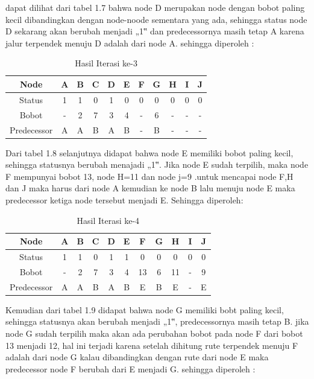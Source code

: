 \begin{enumerate}
dapat dilihat dari tabel 1.7 bahwa node D merupakan node dengan bobot paling kecil dibandingkan dengan node-noode sementara yang ada, sehingga status node D sekarang akan berubah menjadi „1‟ dan predecessornya masih tetap A karena jalur terpendek menuju D adalah dari node A. sehingga diperoleh :

\begin{table}[htbp]
\begin{center}
\begin{tabular}{|c|c|c|c|c|c|c|c|c|c|c|}
\hline
Node & A & B & C & D & E & F & G & H & I & J \\
\hline
Status & 1 & 1 & 0 & 1 & 0 & 0 & 0 & 0 & 0 & 0\\
\hline
Bobot & - & 2 & 7 & 3 & 4 & - & 6 & - & - & - \\
\hline
Predecessor & A & A & B & A & B & - & B & - & -  & - \\
\hline
\end{tabular}
\caption{Hasil Iterasi ke-3}
\end{center}
\end{table}

Dari tabel 1.8 selanjutnya didapat bahwa node E memiliki bobot paling kecil, sehingga statusnya berubah menajadi „1‟. Jika node E sudah terpilih, maka node F mempunyai bobot 13, node H=11 dan node j=9 .untuk mencapai node F,H dan J maka harus dari node A kemudian ke node B lalu menuju node E maka predecessor ketiga node tersebut menjadi E. Sehingga diperoleh:

\begin{table}[htbp]
\begin{center}
\begin{tabular}{|c|c|c|c|c|c|c|c|c|c|c|}
\hline
Node & A & B & C & D & E & F & G & H & I & J \\
\hline
Status & 1 & 1 & 0 & 1 & 1 & 0 & 0 & 0 & 0 & 0\\
\hline
Bobot & - & 2 & 7 & 3 & 4 & 13 & 6 & 11 & - & 9 \\
\hline
Predecessor & A & A & B & A & B & E & B & E & -  & E \\
\hline
\end{tabular}
\caption{Hasil Iterasi ke-4}
\end{center}
\end{table}

Kemudian dari tabel 1.9 didapat bahwa node G memiliki bobt paling kecil, sehingga statusnya akan berubah menjadi „1‟, predecessornya masih tetap B. jika node G sudah terpilih maka akan ada perubahan bobot pada node F dari bobot 13 menjadi 12, hal ini terjadi karena setelah dihitung rute terpendek menuju F adalah dari node G kalau dibandingkan dengan rute dari node E maka predecessor node F berubah dari E menjadi G. sehingga diperoleh :


\end{enumerate}
